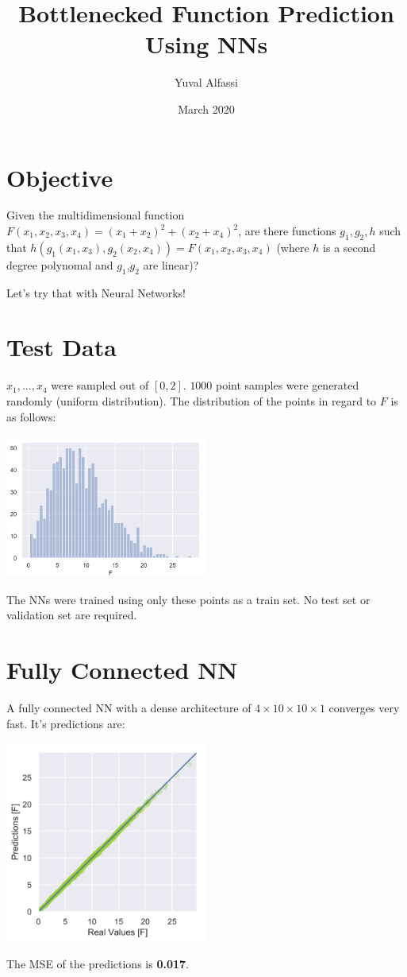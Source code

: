 \documentclass[12pt, conference]{IEEEtran}
\begin{document}
	\title{Bottlenecked Function Prediction Using NNs}
	\author{Yuval Alfassi}
	\date{March 2020}
	\maketitle


    \begin{spacing}{1.5}

		\section{Objective}
			Given the multidimensional function $F(x_1,x_2,x_3,x_4) = (x_1+x_2)^2+(x_2+x_4)^2$, are there functions $g_1,g_2,h$ such that $h(g_1(x_1,x_3),g_2(x_2,x_4)) = F(x_1,x_2,x_3,x_4)$ (where $h$ is a second degree polynomal and $g_1$,$g_2$ are linear)?

			Let's try that with Neural Networks!
		\section{Test Data}
			$x_1,...,x_4$ were sampled out of $[0,2]$. $1000$ point samples were generated randomly (uniform distribution). The distribution of the points in regard to $F$ is as follows:
			\begin{center}
				\includegraphics[width=0.5\textwidth]{Figures/points_distribution.png}
			\end{center}
			The NNs were trained using only these points as a train set. No test set or validation set are required.

		\section{Fully Connected NN}
			A fully connected NN with a dense architecture of $4\times10\times10\times1$ converges very fast. It's predictions are:
			\begin{center}
				\includegraphics[width=0.5\textwidth]{Figures/fully_nn_predictions.png}
			\end{center}
			The MSE of the predictions is \textbf{0.017}.


\end{spacing}
\end{document}
